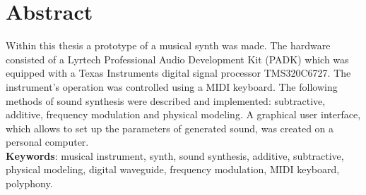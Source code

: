 \chapter*{Abstract}
Within this thesis a prototype of a musical synth was made. The hardware consisted of a Lyrtech Professional Audio Development Kit (PADK) which was equipped with a Texas Instruments digital signal processor TMS320C6727. The instrument's operation was controlled using a MIDI keyboard. The following methods of sound synthesis were described and implemented: subtractive, additive, frequency modulation and physical modeling. A graphical user interface, which allows to set up the parameters of generated sound, was created on a personal computer.
\newline
\\
\textbf{Keywords}: musical instrument, synth, sound synthesis, additive, subtractive, physical modeling, digital waveguide, frequency modulation, MIDI keyboard, polyphony.

